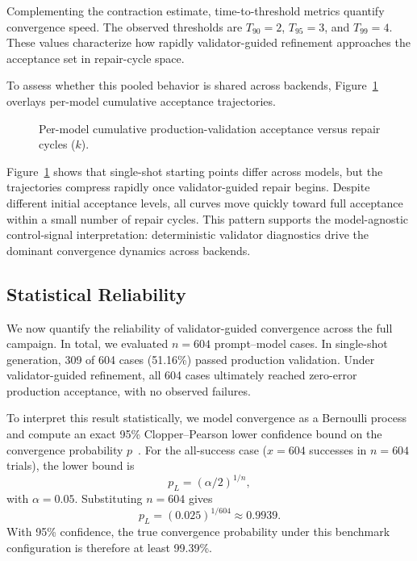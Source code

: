 Complementing the contraction estimate, time-to-threshold metrics quantify convergence speed. The observed thresholds are $T_{90}=2$, $T_{95}=3$, and $T_{99}=4$. These values characterize how rapidly validator-guided refinement approaches the acceptance set in repair-cycle space.

To assess whether this pooled behavior is shared across backends, Figure~\ref{fig:cumulative_convergence_by_model} overlays per-model cumulative acceptance trajectories.

\begin{figure}[H]
\centering

\caption{Per-model cumulative production-validation acceptance versus repair cycles ($k$).}
\label{fig:cumulative_convergence_by_model}
\end{figure}

Figure~\ref{fig:cumulative_convergence_by_model} shows that single-shot starting points differ across models, but the trajectories compress rapidly once validator-guided repair begins. Despite different initial acceptance levels, all curves move quickly toward full acceptance within a small number of repair cycles. This pattern supports the model-agnostic control-signal interpretation: deterministic validator diagnostics drive the dominant convergence dynamics across backends.

\subsection{Statistical Reliability}

We now quantify the reliability of validator-guided convergence across the full campaign. In total, we evaluated $n=604$ prompt--model cases. In single-shot generation, 309 of 604 cases (51.16\%) passed production validation. Under validator-guided refinement, all 604 cases ultimately reached zero-error production acceptance, with no observed failures.

To interpret this result statistically, we model convergence as a Bernoulli process and compute an exact 95\% Clopper--Pearson lower confidence bound on the convergence probability $p$~\cite{clopper1934confidenceLimits}. For the all-success case ($x=604$ successes in $n=604$ trials), the lower bound is
\[
p_L = (\alpha/2)^{1/n},
\]
with $\alpha=0.05$. Substituting $n=604$ gives
\[
p_L = (0.025)^{1/604} \approx 0.9939.
\]
With 95\% confidence, the true convergence probability under this benchmark configuration is therefore at least 99.39\%.

